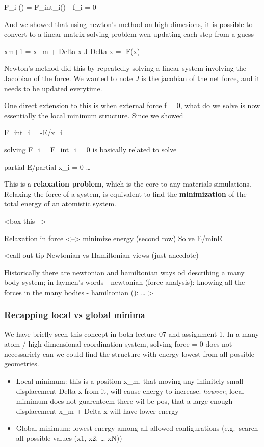 \documentclass[
  11pt,
  letterpaper,
  DIV=11,
  numbers=noendperiod]{scrartcl}
\providecommand{\tightlist}{%
  \setlength{\itemsep}{0pt}\setlength{\parskip}{0pt}}
\begin{document}
F\_i (\matbbf) = F\_int\_i(\mathbf) - f\_i = 0

And we showed that using newton's method on high-dimesions, it is
possible to convert to a linear matrix solving problem wen updating each
step from a guess

xm+1 = x\_m + Delta x J Delta x = -F(x)

Newton's method did this by repeatedly solving a linear system involving
the Jacobian of the force. We wanted to note \(J\) is the jacobian of
the net force, and it needs to be updated everytime.

One direct extension to this is when external force f = 0, what do we
solve is now essentially the local minimum structure. Since we showed

F\_int\_i = -\partial E/\partial x\_i

solving F\_i = F\_int\_i = 0 is basically related to solve

partial E/partial x\_i = 0 \ldots{}

This is a \textbf{relaxation problem}, which is the core to any
materials simulations. Relaxing the force of a system, is equivalent to
find the \textbf{minimization} of the total energy of an atomistic
system.

\textless box this --\textgreater{}

Relaxation in force \textless--\textgreater{} minimize energy (second
row) Solve \partia E/\partialx  minE

\textless call-out tip Newtonian vs Hamiltonian views (just anecdote)

Historically there are newtonian and hamiltonian ways od describing a
many body system; in laymen's words - newtonian (force analysis):
knowing all the forces in the many bodies - hamiltonian (): \ldots{}
\textgreater{}

\subsubsection{Recapping local vs global
minima}\label{recapping-local-vs-global-minima}

We have briefly seen this concept in both lecture 07 and assignment 1.
In a many atom / high-dimensional coordination system, solving force = 0
does not necessariely ean we could find the structure with energy lowest
from all possible geometries.

\begin{itemize}
\tightlist
\item
  Local minimum: this is a position x\_m, that moving any infinitely
  small displacement Delta x from it, will cause energy to increase.
  \emph{howver}, local mimimum does not guarenteem there wil be pos,
  that a large enough displacement x\_m + Delta x will have lower energy
\item
  Global minimum: lowest energy among all allowed configurations
  (e.g.~search all possible values (x1, x2, \ldots{} xN))
\end{itemize}
\end{document}

